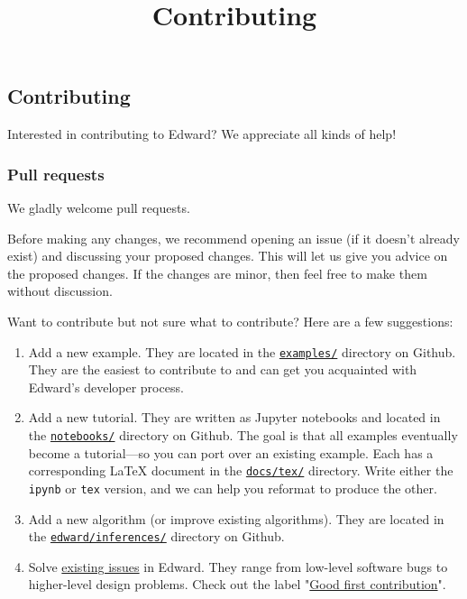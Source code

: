 \title{Contributing}

\subsection{Contributing}

Interested in contributing to Edward? We appreciate all kinds of help!

\subsubsection{Pull requests}

We gladly welcome pull requests.

Before making any changes, we recommend opening an issue (if it
doesn't already exist) and discussing your proposed changes. This will
let us give you advice on the proposed changes. If the changes are
minor, then feel free to make them without discussion.

Want to contribute but not sure what to contribute? Here are a few
suggestions:
\begin{enumerate}
\item
Add a new example.  They are located in the
\href{https://github.com/blei-lab/edward/tree/master/examples}
{\texttt{examples/}} directory on Github.
They are the easiest to contribute to and
can get you acquainted with Edward's developer process.
\item
Add a new tutorial. They are written as Jupyter notebooks and located
in the
\href{https://github.com/blei-lab/edward/tree/master/notebooks}
{\texttt{notebooks/}} directory on Github.
The goal is that all examples eventually become a tutorial---so you
can port over an existing example.
Each has a corresponding LaTeX document in the
\href{https://github.com/blei-lab/edward/tree/master/docs/tex}
{\texttt{docs/tex/}} directory.
Write either the \texttt{ipynb} or \texttt{tex} version, and we can
help you reformat to produce the other.
\item
Add a new algorithm (or improve existing algorithms).
They are located in the
\href{https://github.com/blei-lab/edward/tree/master/edward/inferences}
{\texttt{edward/inferences/}} directory on Github.
\item
Solve
\href{https://github.com/blei-lab/edward/issues}{existing issues}
in Edward. They range from low-level software bugs to higher-level
design problems. Check out the label
"\href{https://github.com/blei-lab/edward/issues?q=is\%3Aissue+is\%3Aopen+label\%3A\%22Good+first+contribution\%22}
{Good first contribution}".
\end{enumerate}

